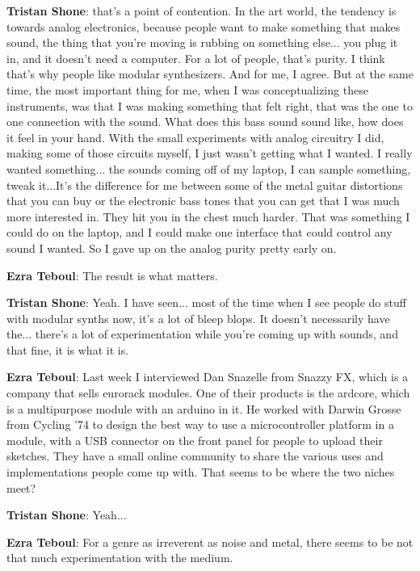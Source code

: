 \textbf{Tristan Shone}: that's a point of contention. In the art world, the tendency is towards analog electronics, because people want to make something that makes sound, the thing that you're moving is rubbing on something else... you plug it in, and it doesn't need a computer. For a lot of people, that's purity. I think that's why people like modular synthesizers. And for me, I agree. But at the same time, the most important thing for me, when I was conceptualizing these instruments, was that I was making something that felt right, that was the one to one connection with the sound. What does this bass sound sound like, how does it feel in your hand. With the small experiments with analog circuitry I did, making some of those circuits myself, I just wasn't getting what I wanted. I really wanted something... the sounds coming off of my laptop, I can sample something, tweak it...It's the difference for me between some of the metal guitar distortions that you can buy or the electronic bass tones that you can get that I was much more interested in. They hit you in the chest much harder. That was something I could do on the laptop, and I could make one interface that could control any sound I wanted. So I gave up on the analog purity pretty early on. 

\textbf{Ezra Teboul}: The result is what matters. 

\textbf{Tristan Shone}: Yeah. I have seen... most of the time when I see people do stuff with modular synths now, it's a lot of bleep blops. It doesn't necessarily have the... there's a lot of experimentation while you're coming up with sounds, and that fine, it is what it is. 

\textbf{Ezra Teboul}: Last week I interviewed Dan Snazelle from Snazzy FX, which is a company that sells eurorack modules. One of their products is the ardcore, which is a multipurpose module with an arduino in it. He worked with Darwin Grosse from Cycling '74 to design the best way to use a microcontroller platform in a module, with a USB connector on the front panel for people to upload their sketches. They have a small online community to share the various uses and implementations people come up with. That seems to be where the two niches meet? 

\textbf{Tristan Shone}: Yeah... 

\textbf{Ezra Teboul}: For a genre as irreverent as noise and metal, there seems to be not that much experimentation with the medium. 

